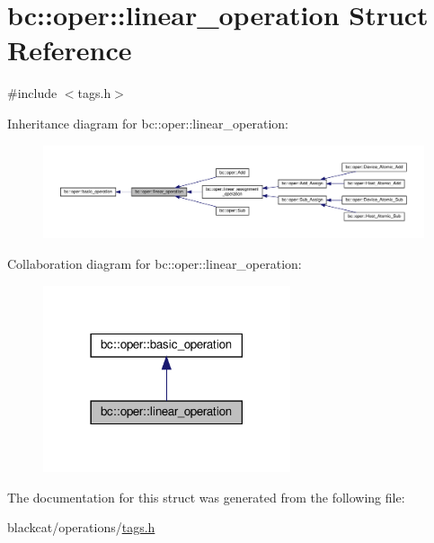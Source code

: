 \hypertarget{structbc_1_1oper_1_1linear__operation}{}\section{bc\+:\+:oper\+:\+:linear\+\_\+operation Struct Reference}
\label{structbc_1_1oper_1_1linear__operation}


{\ttfamily \#include $<$tags.\+h$>$}



Inheritance diagram for bc\+:\+:oper\+:\+:linear\+\_\+operation\+:\nopagebreak
\begin{figure}[H]
\begin{center}
\leavevmode
\includegraphics[width=350pt]{structbc_1_1oper_1_1linear__operation__inherit__graph}
\end{center}
\end{figure}


Collaboration diagram for bc\+:\+:oper\+:\+:linear\+\_\+operation\+:\nopagebreak
\begin{figure}[H]
\begin{center}
\leavevmode
\includegraphics[width=206pt]{structbc_1_1oper_1_1linear__operation__coll__graph}
\end{center}
\end{figure}


The documentation for this struct was generated from the following file\+:\begin{DoxyCompactItemize}
\item 
blackcat/operations/\hyperlink{tags_8h}{tags.\+h}\end{DoxyCompactItemize}
